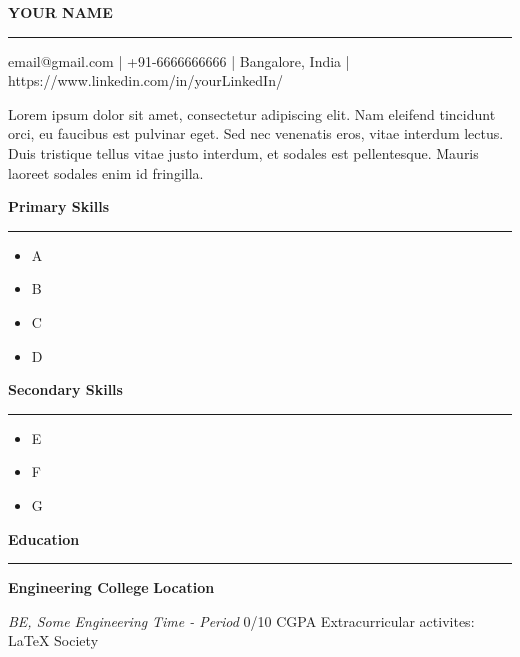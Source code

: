 \documentclass{article}[12pt]
\author{Shrivathsa M S}
\begin{document}
    \begin{center}
        \Huge{\textbf{YOUR NAME}}
        \vskip6pt \hrule height 0.6pt \relax
    \end{center}

    \normalsize email@gmail.com \hfill | \hfill +91-6666666666 \hfill | \hfill Bangalore, India \hfill | \hfill https://www.linkedin.com/in/yourLinkedIn/
    
    \vskip10pt 
    Lorem ipsum dolor sit amet, consectetur adipiscing elit. Nam eleifend tincidunt orci, eu faucibus est pulvinar eget. Sed nec venenatis eros, vitae interdum lectus. Duis tristique tellus vitae justo interdum, et sodales est pellentesque. Mauris laoreet sodales enim id fringilla. 
    
    \medskip
    \begin{center}
    \begin{minipage}[t]{0.45\textwidth}
        \centering
        \large{\textbf{Primary Skills}}
        \vskip3pt \hrule height 0.6pt \relax
        \normalsize
        \begin{itemize}
        \setlength{\itemsep}{0pt}
            \item A
            \item B
            \item C
            \item D
        \end{itemize}
    \end{minipage}\qquad
    \begin{minipage}[t]{0.45\textwidth}
        \centering
        \large{\textbf{Secondary Skills}}
        \vskip3pt \hrule height 0.6pt \relax
        \normalsize
        \begin{itemize}
        \setlength{\itemsep}{0pt}
            \item E
            \item F
            \item G
        \end{itemize}
    \end{minipage}
    \end{center}
    
    \vskip12pt
    
    \huge{\textbf{Education}}
    \vskip9pt \hrule height 0.6pt \relax 
    \vskip6pt
    \large \textbf{Engineering College} \hfill \textbf{Location}
    
    \textit{BE, Some Engineering} \hfill \textit{Time - Period}
    \vskip3pt
    0/10 CGPA
    \newline Extracurricular activites: LaTeX Society
    
\end{document}
